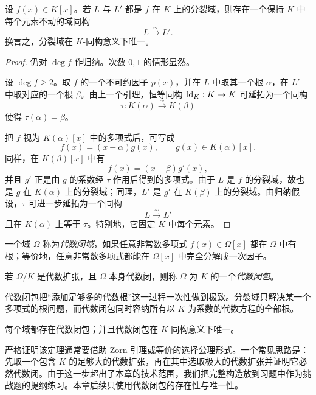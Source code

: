 \begin{theorem}[分裂域的唯一性]
设 $f(x)\in K[x]$。若 $L$ 与 $L'$ 都是 $f$ 在 $K$ 上的分裂域，则存在一个保持 $K$ 中每个元素不动的域同构
\[
L\xrightarrow{\sim}L'.
\]
换言之，分裂域在 $K$-同构意义下唯一。
\end{theorem}

\begin{proof}
仍对 $\deg f$ 作归纳。次数 $0,1$ 的情形显然。

设 $\deg f\ge2$。取 $f$ 的一个不可约因子 $p(x)$，并在 $L$ 中取其一个根 $\alpha$，在 $L'$ 中取对应的一个根 $\beta$。由上一个引理，恒等同构 $\mathrm{Id}_K:K\to K$ 可延拓为一个同构
\[
\tau:K(\alpha)\xrightarrow{\sim}K(\beta)
\]
使得 $\tau(\alpha)=\beta$。

把 $f$ 视为 $K(\alpha)[x]$ 中的多项式后，可写成
\[
f(x)=(x-\alpha)g(x),\qquad g(x)\in K(\alpha)[x].
\]
同样，在 $K(\beta)[x]$ 中有
\[
f(x)=(x-\beta)g'(x),
\]
并且 $g'$ 正是由 $g$ 的系数经 $\tau$ 作用后得到的多项式。由于 $L$ 是 $f$ 的分裂域，故也是 $g$ 在 $K(\alpha)$ 上的分裂域；同理，$L'$ 是 $g'$ 在 $K(\beta)$ 上的分裂域。由归纳假设，$\tau$ 可进一步延拓为一个同构
\[
L\xrightarrow{\sim}L'
\]
且在 $K(\alpha)$ 上等于 $\tau$。特别地，它固定 $K$ 中每个元素。
\end{proof}

\begin{definition}
一个域 $\Omega$ 称为\emph{代数闭域}，如果任意非常数多项式 $f(x)\in\Omega[x]$ 都在 $\Omega$ 中有根；等价地，任意非常数多项式都能在 $\Omega[x]$ 中完全分解成一次因子。

若 $\Omega/K$ 是代数扩张，且 $\Omega$ 本身代数闭，则称 $\Omega$ 为 $K$ 的一个\emph{代数闭包}。
\end{definition}

\begin{remark}
代数闭包把“添加足够多的代数根”这一过程一次性做到极致。分裂域只解决某一个多项式的根问题，而代数闭包同时容纳所有以 $K$ 为系数的代数方程的全部根。
\end{remark}

\begin{theorem}
每个域都存在代数闭包；并且代数闭包在 $K$-同构意义下唯一。
\end{theorem}

\begin{remark}
严格证明该定理通常要借助 Zorn 引理或等价的选择公理形式。一个常见思路是：先取一个包含 $K$ 的足够大的代数扩张，再在其中选取极大的代数扩张并证明它必然代数闭。由于这一步超出了本章的技术范围，我们把完整构造放到习题中作为挑战题的提纲练习。本章后续只使用代数闭包的存在性与唯一性。
\end{remark}

